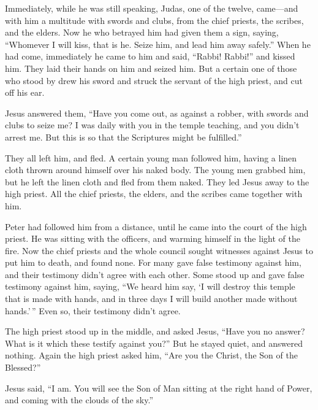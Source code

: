  Immediately, while he was still speaking, Judas, one of
the twelve, came---and with him a multitude with swords and clubs, from
the chief priests, the scribes, and the elders.  Now he who
betrayed him had given them a sign, saying, ``Whomever I will kiss, that
is he. Seize him, and lead him away safely.''  When he had
come, immediately he came to him and said, ``Rabbi! Rabbi!'' and kissed
him.  They laid their hands on him and seized him.
 But a certain one of those who stood by drew his sword and
struck the servant of the high priest, and cut off his ear.

 Jesus answered them, ``Have you come out, as against a
robber, with swords and clubs to seize me?  I was daily
with you in the temple teaching, and you didn't arrest me. But this is
so that the Scriptures might be fulfilled.''

 They all left him, and fled.  A certain young
man followed him, having a linen cloth thrown around himself over his
naked body. The young men grabbed him,  but he left the
linen cloth and fled from them naked.  They led Jesus away
to the high priest. All the chief priests, the elders, and the scribes
came together with him.

 Peter had followed him from a distance, until he came into
the court of the high priest. He was sitting with the officers, and
warming himself in the light of the fire.  Now the chief
priests and the whole council sought witnesses against Jesus to put him
to death, and found none.  For many gave false testimony
against him, and their testimony didn't agree with each other.
 Some stood up and gave false testimony against him,
saying,  ``We heard him say, `I will destroy this temple
that is made with hands, and in three days I will build another made
without hands.'\,''  Even so, their testimony didn't agree.

 The high priest stood up in the middle, and asked Jesus,
``Have you no answer? What is it which these testify against you?''
 But he stayed quiet, and answered nothing. Again the high
priest asked him, ``Are you the Christ, the Son of the Blessed?''

 Jesus said, ``I am. You will see the Son of Man sitting at
the right hand of Power, and coming with the clouds of the sky.''

